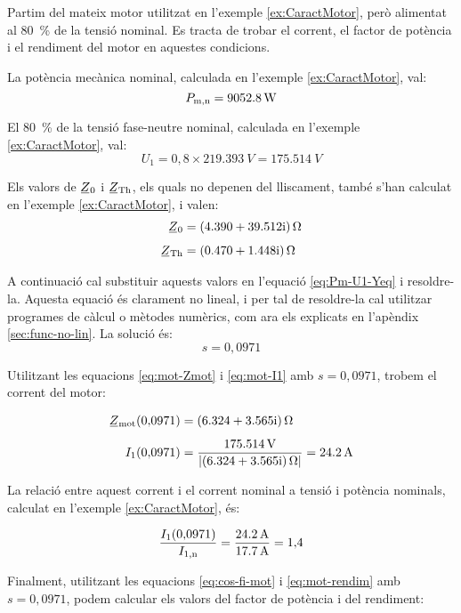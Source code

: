 	
\begin{exemple}\label{ex:MotTensRedSolAp}
	\addcontentsxms{\MotTensRedSolAp}	
	Partim del mateix motor utilitzat en l'exemple \vref{ex:CaractMotor}, però alimentat al \qty{80}{\%} de la tensió nominal. Es tracta de trobar el corrent, el factor de potència i el rendiment del motor en aquestes condicions.
	
	La potència mecànica nominal, calculada  en l'exemple \ref{ex:CaractMotor}, val: \[
	P_\mathrm{m,n} = \qty{9052,8}{W}
	\]
	
	El \qty{80}{\%} de la tensió fase-neutre nominal, calculada  en l'exemple \ref{ex:CaractMotor}, val:
	\[
	U_1 = 0{,}8\times\qty{219,393}{V} = \qty{175,514}{V}
	\]
	
	Els valors de $\cmplx{Z}_0$ i  $\cmplx{Z}\ped{Th}$, els quals no depenen del lliscament, també s'han calculat en  l'exemple \ref{ex:CaractMotor}, i valen:
	\begin{align*}
	\cmplx{Z}_0 &=  \complexqty{4,390+j39,512}{\ohm} \\[1ex]
	\cmplx{Z}\ped{Th} &= \complexqty{0,470+j1,448}{\ohm} 
	\end{align*}
	
	A continuació cal substituir aquests valors en l'equació \eqref{eq:Pm-U1-Yeq} i resoldre-la. Aquesta equació és clarament no lineal, i per tal de resoldre-la cal utilitzar programes de càlcul o mètodes numèrics, com ara els explicats en l'apèndix \ref{sec:func-no-lin}. La solució és:
	\[
	s = 0{,}0971
	\]
	
	Utilitzant les equacions \eqref{eq:mot-Zmot} i \eqref{eq:mot-I1} amb $s  = 0{,}0971$, trobem el corrent del motor:
	
	\begin{align*}
	\cmplx{Z}\ped{mot}(0{,}0971) &=  \complexqty{6,324+j3,565}{\ohm} \\[1ex]
	I_1(0{,}0971) &= \frac{\qty{175,514}{V}}{|\complexqty{6,324+j3,565}{\ohm}|} = \qty{24,2}{A}
	\end{align*}
	
	La relació entre aquest  corrent i el corrent nominal a tensió i potència nominals, calculat en l'exemple \ref{ex:CaractMotor}, és:
	
	\[
	\frac{I_1(0{,}0971)}{I_\mathrm{1,n}} = \frac{\qty{24,2}{A}}{\qty{17,7}{A}} = 1{,}4
	\]
	
	Finalment, utilitzant les equacions  \eqref{eq:cos-fi-mot} i \eqref{eq:mot-rendim} amb $s  = 0{,}0971$, podem calcular els valors del factor de potència i del rendiment:
	

\end{exemple}
